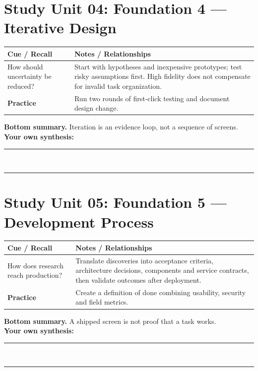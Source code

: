 \documentclass[11pt]{article}
\begin{document}
\section{Study Unit 04: Foundation 4 — Iterative Design}
\begin{longtable}{@{}p{.27\linewidth}p{.66\linewidth}@{}}\toprule
\textbf{Cue / Recall} & \textbf{Notes / Relationships}\\\midrule\endhead
How should uncertainty be reduced? & Start with hypotheses and inexpensive prototypes; test risky assumptions first. High fidelity does not compensate for invalid task organization.\\
\addlinespace[4mm]
\textbf{Practice} & Run two rounds of first-click testing and document design change.\\\bottomrule\end{longtable}
\begin{dosnotebox}\textbf{Bottom summary.} Iteration is an evidence loop, not a sequence of screens.\\[2mm]
\textbf{Your own synthesis:} \rule{.72\linewidth}{.4pt}\\[4mm]
\rule{.96\linewidth}{.4pt}\end{dosnotebox}

\section{Study Unit 05: Foundation 5 — Development Process}
\begin{longtable}{@{}p{.27\linewidth}p{.66\linewidth}@{}}\toprule
\textbf{Cue / Recall} & \textbf{Notes / Relationships}\\\midrule\endhead
How does research reach production? & Translate discoveries into acceptance criteria, architecture decisions, components and service contracts, then validate outcomes after deployment.\\
\addlinespace[4mm]
\textbf{Practice} & Create a definition of done combining usability, security and field metrics.\\\bottomrule\end{longtable}
\begin{dosnotebox}\textbf{Bottom summary.} A shipped screen is not proof that a task works.\\[2mm]
\textbf{Your own synthesis:} \rule{.72\linewidth}{.4pt}\\[4mm]
\rule{.96\linewidth}{.4pt}\end{dosnotebox}
\end{document}
